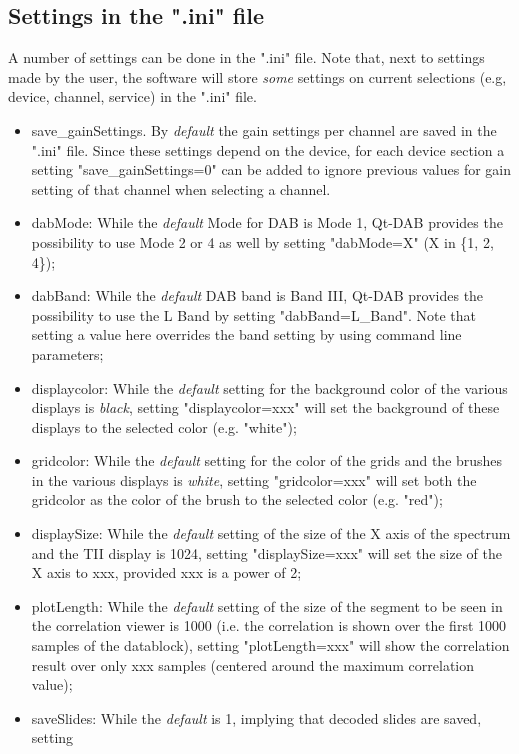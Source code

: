 \documentclass[12pt]{article}
\begin{document}
\subsection{Settings in the ".ini" file}
A number of settings can be done in the ".ini" file.
Note that, next to settings made by the user, the software
will store {\em some} settings on current 
selections (e.g, device, channel, service) in the ".ini" file.
\begin{itemize}
\item save\_gainSettings.
By {\em default} the gain settings per channel are saved in the ".ini" file.
Since these settings depend on the device, for each device section a
setting "save\_gainSettings=0" can be added to ignore previous values
for gain setting of that channel when selecting a channel.
\item dabMode:
While the {\em default} Mode for DAB is Mode 1, Qt-DAB provides the
possibility to use Mode 2 or 4 as well by setting "dabMode=X" (X in \{1, 2, 4\});
\item dabBand:
While the {\em default} DAB band is Band III,
Qt-DAB  provides the possibility
to use the L Band by setting "dabBand=L\_Band". Note that setting a value
here overrides the band setting by using command line parameters;
\item displaycolor:
While the {\em default} setting for the background color of the various
displays is {\em black}, setting "displaycolor=xxx" will set the
background of these displays to the selected color (e.g. "white");
\item gridcolor:
While the {\em default} setting for the color of the grids and the brushes
in the various displays is {\em white}, setting "gridcolor=xxx" will
set both the gridcolor as the color of the brush to the selected color (e.g.
"red");
\item displaySize:
While the {\em default} setting of the size of the X axis of the spectrum
and the TII display is 1024, setting "displaySize=xxx" will set the
size of the X axis to xxx, provided xxx is a power of 2;
\item plotLength:
While the {\em default} setting of the size of the segment to be seen
in the correlation viewer is 1000 (i.e. the correlation is shown
over the first 1000 samples of the datablock), setting "plotLength=xxx"
will show the correlation result over only xxx samples (centered around
the maximum correlation value);
\item saveSlides:
While the {\em default} is 1, implying that decoded slides are saved, setting

\end{itemize}
\end{document}
